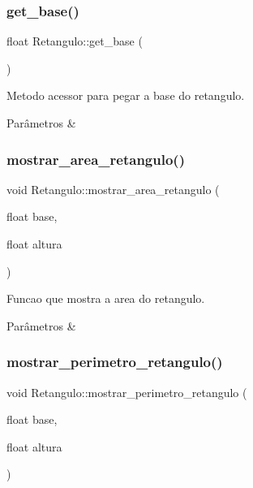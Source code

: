\subsubsection{\texorpdfstring{get\+\_\+base()}{get\_base()}}
{\footnotesize\ttfamily float Retangulo\+::get\+\_\+base (\begin{DoxyParamCaption}{ }\end{DoxyParamCaption})}



Metodo acessor para pegar a base do retangulo. 


\begin{DoxyParams}{Parâmetros}
{\em } & \\
\hline
\end{DoxyParams}
\mbox{\label{classRetangulo_a7397f5bd0d3a434bdabf9866fdce2958}} 
\subsubsection{\texorpdfstring{mostrar\+\_\+area\+\_\+retangulo()}{mostrar\_area\_retangulo()}}
{\footnotesize\ttfamily void Retangulo\+::mostrar\+\_\+area\+\_\+retangulo (\begin{DoxyParamCaption}\item[{float}]{base,  }\item[{float}]{altura }\end{DoxyParamCaption})}



Funcao que mostra a area do retangulo. 


\begin{DoxyParams}{Parâmetros}
{\em } & \\
\hline
\end{DoxyParams}
\mbox{\label{classRetangulo_a321fb1a2fe5639324573d6027511dc42}} 
\subsubsection{\texorpdfstring{mostrar\+\_\+perimetro\+\_\+retangulo()}{mostrar\_perimetro\_retangulo()}}
{\footnotesize\ttfamily void Retangulo\+::mostrar\+\_\+perimetro\+\_\+retangulo (\begin{DoxyParamCaption}\item[{float}]{base,  }\item[{float}]{altura }\end{DoxyParamCaption})}



